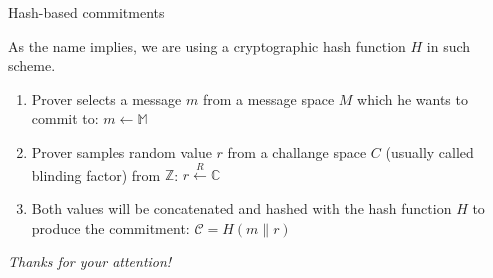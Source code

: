 \documentclass[xcolor={usenames,dvipsnames}]{beamer}
\begin{document}
    \begin{frame}{Hash-based commitments}

        As the name implies, we are using a cryptographic hash function \(H\) in such scheme.

        \begin{definition}
            \begin{enumerate}
                \item Prover selects a message $m$ from a message space $M$ which he wants to commit to:
                    $m \leftarrow \mathbb{M}$
            
                \item Prover samples random value $r$ from a challange space $C$ (usually called blinding factor) from $\mathbb{Z}$:
                    $r \xleftarrow{R} \mathbb{C}$
                
                \item Both values will be concatenated and hashed with the hash function $H$ to produce the commitment:
                    $\mathcal{C} = H(m \parallel r)$
            \end{enumerate}
        \end{definition}

    \end{frame}

    
	\begin{frame}{}
      \centering \Large
      \emph{Thanks for your attention!}
    \end{frame}
\end{document}
